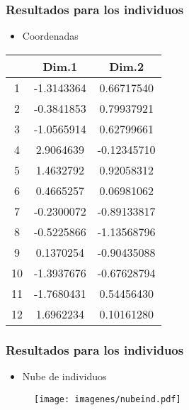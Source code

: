 \documentclass[12pt]{beamer}
\begin{document}
\begin{frame}
\frametitle{Resultados para los individuos}
\begin{itemize}
\item Coordenadas
\end{itemize}
\begin{center}
\begin{tabular}{|c|c|c|}
\hline
 & Dim.1  &     Dim.2 \\
\hline
1 & -1.3143364&  0.66717540 \\
2 & -0.3841853&  0.79937921\\
3 & -1.0565914&  0.62799661\\
4 &  2.9064639& -0.12345710\\
5 &  1.4632792&  0.92058312\\
6 &  0.4665257&  0.06981062\\
7 & -0.2300072& -0.89133817\\
8 & -0.5225866& -1.13568796\\
9 &  0.1370254& -0.90435088\\
10& -1.3937676& -0.67628794\\
11& -1.7680431&  0.54456430\\
12&  1.6962234&  0.10161280\\
\hline
\end{tabular}
\end{center}
\end{frame}

\begin{frame}
\frametitle{Resultados para los individuos}
\begin{itemize}
\item Nube de individuos
\end{itemize}
\begin{figure}[h]
  \centering
  \texttt{[image: imagenes/nubeind.pdf]}
\end{figure}
\end{frame}
\end{document}
